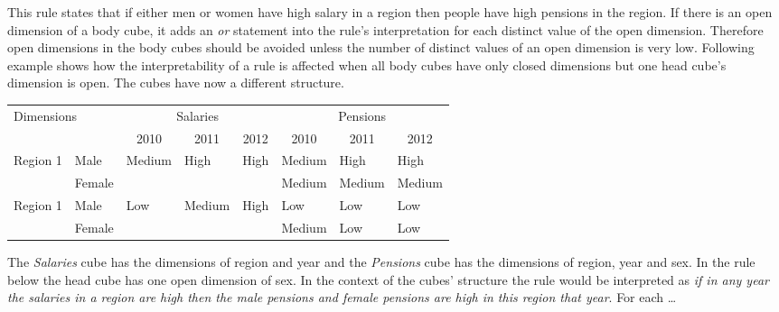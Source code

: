 This rule states that if either men or women have high salary in a region then people have high pensions in the region. If there is an open dimension of a body cube, it adds an \textit{or} statement into the rule's interpretation for each distinct value of the open dimension. Therefore open dimensions in the body cubes should be avoided unless the number of distinct values of an open dimension is very low. Following example shows how the interpretability of a rule is affected when all body cubes have only closed dimensions but one head cube's dimension is open. The cubes have now a different structure.

\begin{table}[h]
\centering
\begin{tabular}{ll|lll|lll}
\multicolumn{2}{l|}{\multirow{2}{*}{Dimensions}} & \multicolumn{3}{c|}{Salaries}                                                   & \multicolumn{3}{c}{Pensions}                                                    \\
\multicolumn{2}{l|}{}                            & \multicolumn{1}{c}{2010} & \multicolumn{1}{c}{2011} & \multicolumn{1}{c|}{2012} & \multicolumn{1}{c}{2010} & \multicolumn{1}{c}{2011} & \multicolumn{1}{c}{2012}  \\ 
\hline
\multirow{2}{*}{Region 1} & Male                 & \multirow{2}{*}{Medium}  & \multirow{2}{*}{High}    & \multirow{2}{*}{High}     & Medium                   & High                     & High                      \\
                          & Female               &                          &                          &                           & Medium                   & Medium                   & Medium                    \\
\multirow{2}{*}{Region 1} & Male                 & \multirow{2}{*}{Low}     & \multirow{2}{*}{Medium}  & \multirow{2}{*}{High}     & Low                      & Low                      & Low                       \\
                          & Female               &                          &                          &                           & Medium                   & Low                      & Low                      
\end{tabular}
\end{table}

The \textit{Salaries} cube has the dimensions of region and year and the \textit{Pensions} cube has the dimensions of region, year and sex. In the rule below the head cube has one open dimension of sex. In the context of the cubes' structure the rule would be interpreted as \textit{if in any year the salaries in a region are high then the male pensions and female pensions are high in this region that year}. For each \dots

